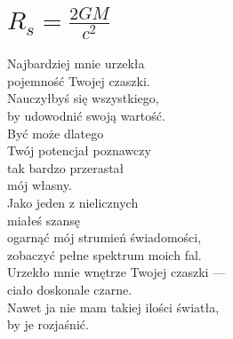 \documentclass[12pt, a4paper]{memoir}
\renewenvironment{verse}{%
  \par\vspace{\baselineskip}\raggedright
}{
  \par\vspace{\baselineskip}
}
\begin{document}
\clearpage

\section[Promień Schwarzschilda]{$R_s = \frac{2GM}{c^2}$}
\begin{verse}
Najbardziej mnie urzekła\\
pojemność Twojej czaszki.\\
Nauczyłbyś się wszystkiego,\\
by udowodnić swoją wartość.\\
Być może dlatego\\
Twój potencjał poznawczy\\
tak bardzo przerastał\\
mój własny.\\[\baselineskip]

Jako jeden z nielicznych\\
miałeś szansę\\
ogarnąć mój strumień świadomości,\\
zobaczyć pełne spektrum moich fal.\\[\baselineskip]

Urzekło mnie wnętrze Twojej czaszki ---\\
ciało doskonale czarne.\\[\baselineskip]

Nawet ja nie mam takiej ilości światła,\\
by je rozjaśnić.
\end{verse}

\clearpage
\end{document}
